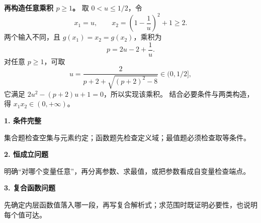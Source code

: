 \begin{frame}
\textbf{再构造任意乘积 $p\ge1$。}
取 $0<u\le1/2$，令
\[x_1=u,\qquad x_2=\left(1-\frac1u\right)^2+1\ge2.\]
两个输入不同，且 $g(x_1)=x_2=g(x_2)$，乘积为
\[p=2u-2+\frac1u.\]
对任意 $p\ge1$，可取
\[u=\frac{2}{p+2+\sqrt{(p+2)^2-8}}\in(0,1/2],\]
它满足 $2u^2-(p+2)u+1=0$，所以实现该乘积。
结合必要条件与两类构造，得 $\boxed{x_1x_2\in(0,+\infty)}$。
\end{frame}

\begin{frame}
\textbf{1. 条件完整}\par
集合题检查空集与元素约定；函数题先检查定义域；最值题必须检查取等条件。
\pause
\par\vspace{4mm}
\textbf{2. 恒成立问题}\par
明确“对哪个变量任意”，再分离参数、求最值，或把参数看成自变量检查端点。
\pause
\par\vspace{4mm}
\textbf{3. 复合函数问题}\par
先确定内层函数值落入哪一段，再写复合解析式；求范围时既证明必要性，也说明每个值可达。
\end{frame}
